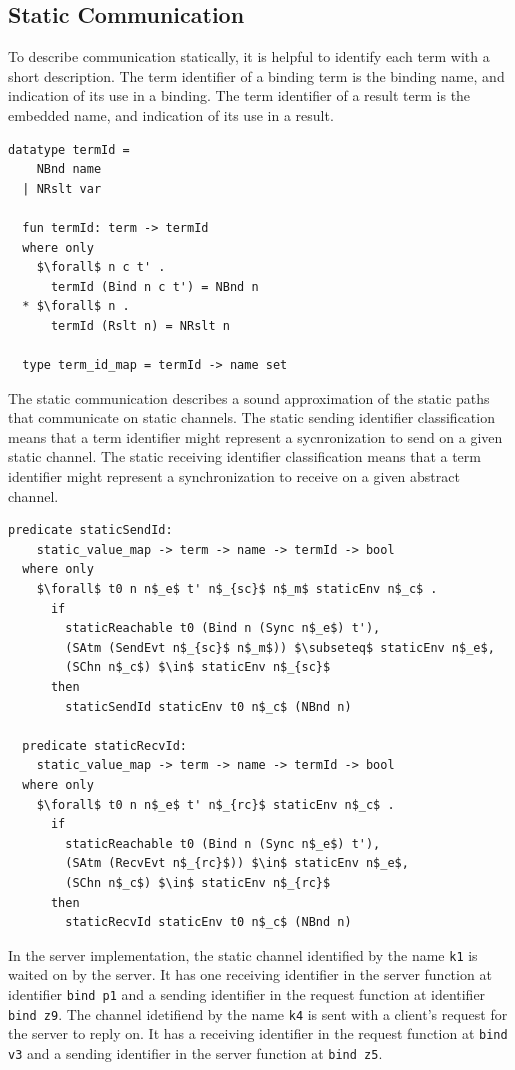 \documentclass[letterpaper, 11pt]{extarticle}
\begin{document}
\subsection{Static Communication}
To describe communication statically, it is helpful to identify each term with a short description.
The term identifier of a binding term is the binding name, and indication of its use in a binding.
The term identifier of a result term is the embedded name, and indication of its use in a result.

\begin{lstlisting}[language=logic, mathescape]
  datatype termId =
    NBnd name
  | NRslt var

  fun termId: term -> termId
  where only
    $\forall$ n c t' . 
      termId (Bind n c t') = NBnd n
  * $\forall$ n . 
      termId (Rslt n) = NRslt n

  type term_id_map = termId -> name set
\end{lstlisting}

The static communication describes a sound approximation of
the static paths that communicate on static channels.
The static sending identifier classification means that a term identifier might represent a
sycnronization to send on a given static channel.
The static receiving identifier classification means that a term identifier might represent a
synchronization to receive on a given abstract channel. 

\begin{lstlisting}[language=logic, mathescape]
  predicate staticSendId:
    static_value_map -> term -> name -> termId -> bool
  where only
    $\forall$ t0 n n$_e$ t' n$_{sc}$ n$_m$ staticEnv n$_c$ .
      if
        staticReachable t0 (Bind n (Sync n$_e$) t'),
        (SAtm (SendEvt n$_{sc}$ n$_m$)) $\subseteq$ staticEnv n$_e$, 
        (SChn n$_c$) $\in$ staticEnv n$_{sc}$
      then
        staticSendId staticEnv t0 n$_c$ (NBnd n)

  predicate staticRecvId:
    static_value_map -> term -> name -> termId -> bool
  where only
    $\forall$ t0 n n$_e$ t' n$_{rc}$ staticEnv n$_c$ .
      if
        staticReachable t0 (Bind n (Sync n$_e$) t'),
        (SAtm (RecvEvt n$_{rc}$)) $\in$ staticEnv n$_e$, 
        (SChn n$_c$) $\in$ staticEnv n$_{rc}$ 
      then
        staticRecvId staticEnv t0 n$_c$ (NBnd n)
\end{lstlisting}


In the server implementation,
the static channel identified by the name \lstinline{k1} is waited on
by the server.  It has one receiving identifier in the server function
at identifier \lstinline[language=sugar_lang]{bind p1} and a sending identifier 
in the request function at identifier \lstinline[language=sugar_lang]{bind z9}.
The channel idetifiend by the name \lstinline{k4} is sent with a client's request for
the server to reply on. It has a receiving identifier in the request function at
\lstinline[language=sugar_lang]{bind v3} and a sending identifier in the server function at
\lstinline[language=sugar_lang]{bind z5}.
\end{document}
